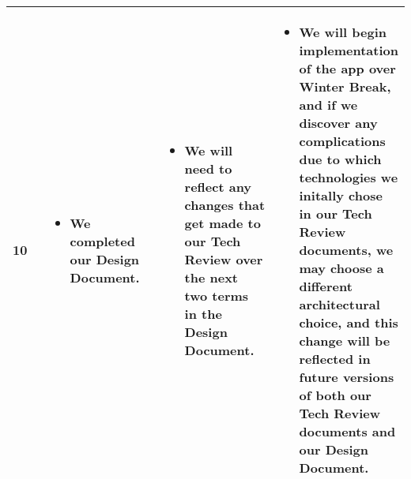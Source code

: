 \documentclass[draftclsnofoot, onecolumn, 10pt, compsoc]{IEEEtran}
\begin{document}
\begin{longtable}{|p{0.1\linewidth}|p{0.3\linewidth}|p{0.3\linewidth}|p{0.3\linewidth}|}
         10
         &
         \begin{itemize}
            \item We completed our Design Document.
         \end{itemize}
         &
         \begin{itemize}
            \item We will need to reflect any changes that get made to our Tech Review over the next two terms in the Design Document.
         \end{itemize}
         &
         \begin{itemize}
            \item We will begin implementation of the app over Winter Break, and if we discover any complications due to which technologies we initally chose in our Tech Review documents, we may choose a different architectural choice, and this change will be reflected in future versions of both our Tech Review documents and our Design Document.
         \end{itemize} \\ \hline
      \end{longtable}

   
   
\end{document}
